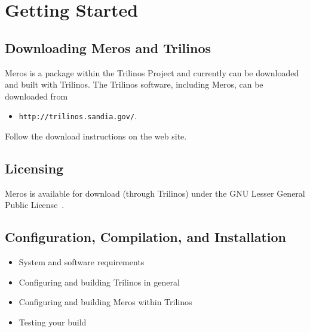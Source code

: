 \section{Getting Started}

\subsection{Downloading Meros and Trilinos}
Meros is a package within the Trilinos Project and currently can be
downloaded and built with Trilinos.
The Trilinos software, including Meros, can be downloaded from
\begin{itemize}
\item[]
  {\tt http://trilinos.sandia.gov/}. 
\end{itemize}
Follow the download instructions on
the web site.



\subsection{Licensing}
Meros is available for download (through Trilinos) under the GNU
Lesser General Public License~\cite{gnuLGPL}.


\subsection{Configuration, Compilation, and Installation}
\begin{itemize}
\item System and software requirements
\item Configuring and building Trilinos in general
\item Configuring and building Meros within Trilinos
\item Testing your build
\end{itemize}



